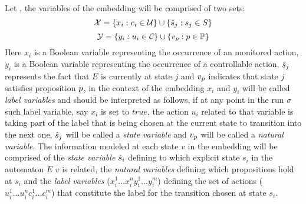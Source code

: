 %
Let \cltsDef, the variables of the embedding will be comprised of two sets:
\[{\mathcal{X}} = \{x_i : c_i \in \mathcal{U} \} \cup \{\hat{s}_{j} : s_j \in S \}\]
\[{\mathcal{Y}} = \{y_i : u_i \in \mathcal{C} \} \cup \{v_{p} : p \in \mathbb{P}\}\]
Here $x_i$ is a Boolean variable representing the occurrence of an monitored action, $y_i$ is a Boolean variable representing the occurrence of a controllable action, $\hat{s}_{j}$ represents the fact that $E$ is currently at state $j$ and $v_{p}$ indicates that state $j$ satisfies proposition $p$,  in the context of the embedding $x_i$ and $y_i$ will be called \emph{label variables} and should be interpreted as follows, if at any point in the run $\sigma$ such label variable, say $x_i$ is set to $true$, the action $u_i$ related to that variable is taking part of the label that is being chosen at the current state to transition into the next one, $\hat{s}_{j}$ will be called a \emph{state variable} and $v_{p}$ will be called a \emph{natural variable}. The information modeled at each state $v$ in the embedding \fdsEmbedding will be comprised of the \emph{state variable} $\hat{s}_{i}$ defining to which explicit state $s_i$ in the automaton $E$ $v$ is related, the \emph{natural variables} defining which propositions hold at $s_i$ and the \emph{label variables} ($x_i^1\ldots x_i^n y_i^1\ldots y_i^m$) defining the set of actions ($u_i^1\ldots u_i^n c_i^1\ldots c_i^m$) that constitute the label for the transition chosen at state $s_i$.

